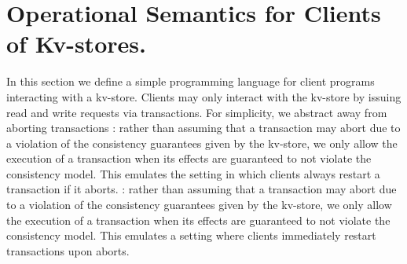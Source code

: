 \section{Operational Semantics for Clients of Kv-stores.}
In this section we define a simple programming language for client programs interacting with a kv-store. Clients may only interact with the kv-store by 
issuing read and write requests via transactions. 
For simplicity, we abstract away from aborting transactions
: rather than assuming that a transaction may abort due to a violation of the consistency guarantees given by the kv-store, we only allow the execution of a transaction when its effects are guaranteed to not violate the consistency model. This emulates the setting in which clients always restart a transaction if it aborts.
: rather than assuming that a transaction may abort due to a violation of the consistency guarantees given by the kv-store, we only allow the execution of a transaction when its effects are guaranteed to not violate the consistency model. This emulates a setting where clients immediately restart transactions upon aborts.


